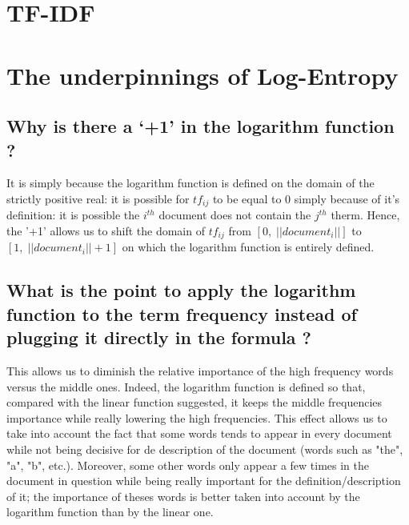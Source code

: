 \documentclass[10pt, a4paper, oneside]{article} %
\begin{document}
\section{TF-IDF}
\section{The underpinnings of Log-Entropy}
\subsection{Why is there a ‘+1’ in the logarithm function ?}
It is simply because the logarithm function is defined on the domain of the strictly positive real: it is possible for $tf_{ij}$ to be equal to 0 simply because of it's definition: it is possible the $i^{th}$ document does not contain the $j^{th}$ therm. Hence, the '+1' allows us to shift the domain of $tf_{ij}$ from $[0,\; \vert\vert document_i \vert\vert ]$ to $[1,\; \vert\vert document_i \vert\vert +1 ]$ on which the logarithm function is entirely defined.
\subsection{What is the point to apply the logarithm function to the term frequency instead of plugging it directly in the formula ?}
This allows us to diminish the relative importance of the high frequency words versus the middle ones. Indeed, the logarithm function is defined so that, compared with the linear function suggested, it keeps the middle frequencies importance while really lowering the high frequencies. This effect allows us to take into account the fact that some words tends to appear in every document while not being decisive for de description of the document (words such as "the", "a", "b", etc.). Moreover, some other words only appear a few times in the document in question while being really important for the definition/description of it; the importance of theses words is better taken into account by the logarithm function than by the linear one.
\end{document}
